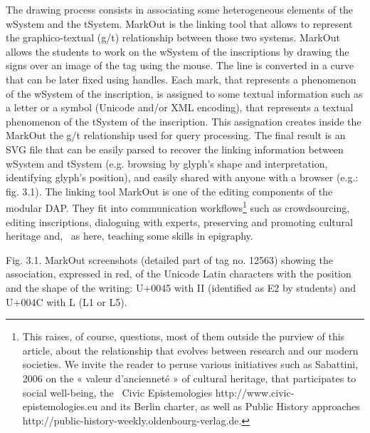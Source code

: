 \documentclass[amsthm,ebook]{saparticle}
\begin{document}
The drawing process consists in associating some heterogeneous elements of the wSystem and the tSystem. MarkOut is the
linking tool that allows to represent the graphico-textual (g/t) relationship between those two systems. MarkOut allows
the students to work on the wSystem of the inscriptions by drawing the signs over an image of the tag using the mouse.
The line is converted in a curve that can be later fixed using handles. Each mark, that represents a phenomenon of the
wSystem of the inscription, is assigned to some textual information such as a letter or a symbol (Unicode and/or XML
encoding), that represents a textual phenomenon of the tSystem of the inscription. This assignation creates inside the
MarkOut the g/t relationship used for query processing. The final result is an SVG file that can be easily parsed to
recover the linking information between wSystem and tSystem (e.g. browsing by glyph's shape and interpretation,
identifying glyph's position), and easily shared with anyone with a browser (e.g.: fig. 3.1). The linking tool MarkOut
is one of the editing components of the modular DAP. They fit into communication workflows\footnote{This raises, of
course, questions, most of them outside the purview of this article, about the relationship that evolves between
research and our modern societies. We invite the reader to peruse various initiatives such as Sabattini, 2006 on the «
valeur d'ancienneté » of cultural heritage, that participates to social well-being, the \ Civic Epistemologies
http://www.civic-epistemologies.eu and its Berlin charter, as well as Public History approaches
http://public-history-weekly.oldenbourg-verlag.de.} such as crowdsourcing, editing inscriptions, dialoguing with
experts, preserving and promoting cultural heritage and, \ as here, teaching some skills in epigraphy.

Fig. 3.1. MarkOut screenshots (detailed part of tag no. 12563) showing the association, expressed in red, of the Unicode
Latin characters with the position and the shape of the writing: U+0045 with II (identified as E2 by students) and
U+004C with L (L1 or L5).
\end{document}
